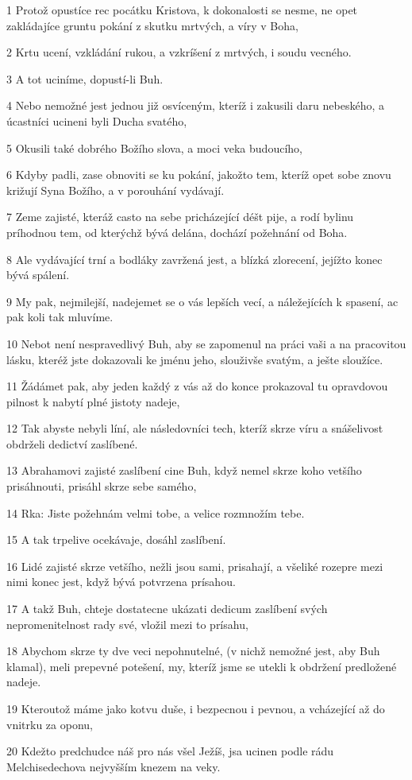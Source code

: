 \par 1 Protož opustíce rec pocátku Kristova, k dokonalosti se nesme, ne opet zakládajíce gruntu pokání z skutku mrtvých, a víry v Boha,
\par 2 Krtu ucení, vzkládání rukou, a vzkríšení z mrtvých, i soudu vecného.
\par 3 A tot uciníme, dopustí-li Buh.
\par 4 Nebo nemožné jest jednou již osvíceným, kteríž i zakusili daru nebeského, a úcastníci ucineni byli Ducha svatého,
\par 5 Okusili také dobrého Božího slova, a moci veka budoucího,
\par 6 Kdyby padli, zase obnoviti se ku pokání, jakožto tem, kteríž opet sobe znovu križují Syna Božího, a v porouhání vydávají.
\par 7 Zeme zajisté, kteráž casto na sebe pricházející déšt pije, a rodí bylinu príhodnou tem, od kterýchž bývá delána, dochází požehnání od Boha.
\par 8 Ale vydávající trní a bodláky zavržená jest, a blízká zlorecení, jejížto konec bývá spálení.
\par 9 My pak, nejmilejší, nadejemet se o vás lepších vecí, a náležejících k spasení, ac pak koli tak mluvíme.
\par 10 Nebot není nespravedlivý Buh, aby se zapomenul na práci vaši a na pracovitou lásku, kteréž jste dokazovali ke jménu jeho, slouživše svatým, a ješte sloužíce.
\par 11 Žádámet pak, aby jeden každý z vás až do konce prokazoval tu opravdovou pilnost k nabytí plné jistoty nadeje,
\par 12 Tak abyste nebyli líní, ale následovníci tech, kteríž skrze víru a snášelivost obdrželi dedictví zaslíbené.
\par 13 Abrahamovi zajisté zaslíbení cine Buh, když nemel skrze koho vetšího prisáhnouti, prisáhl skrze sebe samého,
\par 14 Rka: Jiste požehnám velmi tobe, a velice rozmnožím tebe.
\par 15 A tak trpelive ocekávaje, dosáhl zaslíbení.
\par 16 Lidé zajisté skrze vetšího, nežli jsou sami, prisahají, a všeliké rozepre mezi nimi konec jest, když bývá potvrzena prísahou.
\par 17 A takž Buh, chteje dostatecne ukázati dedicum zaslíbení svých nepromenitelnost rady své, vložil mezi to prísahu,
\par 18 Abychom skrze ty dve veci nepohnutelné, (v nichž nemožné jest, aby Buh klamal), meli prepevné potešení, my, kteríž jsme se utekli k obdržení predložené nadeje.
\par 19 Kteroutož máme jako kotvu duše, i bezpecnou i pevnou, a vcházející až do vnitrku za oponu,
\par 20 Kdežto predchudce náš pro nás všel Ježíš, jsa ucinen podle rádu Melchisedechova nejvyšším knezem na veky.

